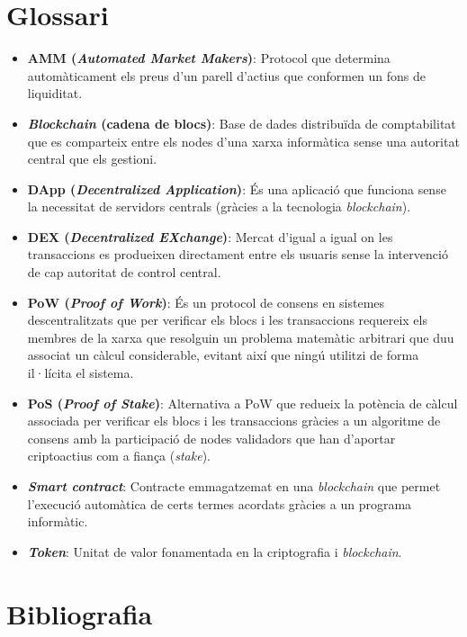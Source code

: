 \documentclass[11pt,a4paper]{article}
\begin{document}
\section{Glossari}\label{sec:glo}
\begin{itemize}
\item \textbf{AMM (\textit{Automated Market Makers})}: Protocol que determina automàticament els preus d'un parell d'actius que conformen un fons de liquiditat.
\item \textbf{\textit{Blockchain} (cadena de blocs)}: Base de dades distribuïda de comptabilitat que es comparteix entre els nodes d'una xarxa informàtica sense una autoritat central que els gestioni.
\item \textbf{DApp (\textit{Decentralized Application})}: És una aplicació que funciona sense la necessitat de servidors centrals (gràcies a la tecnologia \textit{blockchain}).
\item \textbf{DEX (\textit{Decentralized EXchange})}: Mercat d'igual a igual on les transaccions es produeixen directament entre els usuaris sense la intervenció de cap autoritat de control central.
\item \textbf{PoW (\textit{Proof of Work})}: És un protocol de consens en sistemes descentralitzats que per verificar els blocs i les transaccions requereix els membres de la xarxa que resolguin un problema matemàtic arbitrari que duu associat un càlcul considerable, evitant així que ningú utilitzi de forma il·lícita el sistema.
\item \textbf{PoS (\textit{Proof of Stake})}: Alternativa a PoW que redueix la potència de càlcul associada per verificar els blocs i les transaccions gràcies a un algoritme de consens amb la participació de nodes validadors que han d'aportar criptoactius com a fiança (\textit{stake}).
\item \textbf{\textit{Smart contract}}: Contracte emmagatzemat en una \textit{blockchain} que permet l'execució automàtica de certs termes acordats gràcies a un programa informàtic.
\item \textbf{\textit{Token}}: Unitat de valor fonamentada en la criptografia i \textit{blockchain}.
\end{itemize}

\newpage 


\section{Bibliografia}\label{sec:bib}


\end{document}
